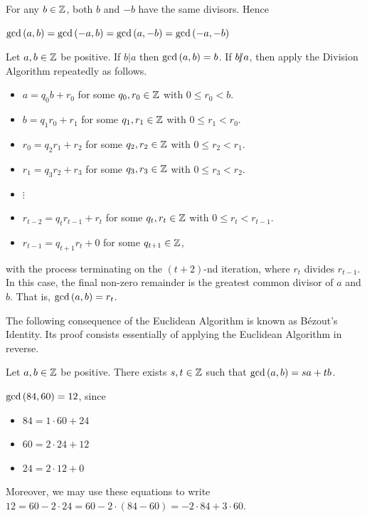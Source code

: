 \documentclass[11pt,fleqn,dvipsnames,usenames]{article}
\newcommand{\p}{\noindent}
\begin{document}
\note For any $b\in\mathbb{Z}$, both $b$ and $-b$ have the same divisors.  Hence
\begin{center}
$\text{gcd}\left(a,b\right) = \text{gcd}\left(-a,b\right) = \text{gcd}\left(a,-b\right) = \text{gcd}\left(-a,-b\right)$
\end{center}
\newpage

\begin{theorem}\label{euclideanalg}
Let $a,b\in\mathbb{Z}$ be positive.  If $b|a$ then $\text{gcd}\left(a,b\right) = b$.  If $b|\kern-0.9ex{/} a$, then apply the Division Algorithm repeatedly as follows.

\begin{itemize}[\ ]
\item $a = q_{0}b + r_{0}$ for some $q_{0},r_{0}\in\mathbb{Z}$ with $0 \leq r_{0} < b$.
\item $b = q_{1}r_{0} + r_{1}$ for some $q_{1},r_{1}\in\mathbb{Z}$ with $0 \leq r_{1} < r_{0}$.
\item $r_{0} = q_{2}r_{1} + r_{2}$ for some $q_{2},r_{2}\in\mathbb{Z}$ with $0 \leq r_{2} < r_{1}$.
\item $r_{1} = q_{3}r_{2} + r_{3}$ for some $q_{3},r_{3}\in\mathbb{Z}$ with $0 \leq r_{3} < r_{2}$.
\item {}$\vdots$
\item $r_{t-2} = q_{t}r_{t-1} + r_{t}$ for some $q_{t},r_{t}\in\mathbb{Z}$ with $0 \leq r_{t} < r_{t-1}$.
\item $r_{t-1} = q_{t+1}r_{t} + 0$ for some $q_{t+1}\in\mathbb{Z}$,
\end{itemize}
with the process terminating on the $(t+2)$-nd iteration, where $r_{t}$ divides $r_{t-1}$.  In this case, the final non-zero remainder is the greatest common divisor of $a$ and $b$.  That is, $\text{gcd}\left(a,b\right) = r_{t}$.
\end{theorem}
\vsp

\p The following consequence of the Euclidean Algorithm is known as B\'{e}zout's Identity.  Its proof consists  essentially of applying the Euclidean Algorithm in reverse.
\vsp

\begin{corollary}\label{bezout}
Let $a,b\in\mathbb{Z}$ be positive.  There exists $s,t\in\mathbb{Z}$ such that $\text{gcd}\left(a,b\right) = sa + tb$.
\end{corollary}
%
\begin{example}
$\text{gcd}\left(84,60\right) = 12$, since
\begin{itemize}[\ ]
\item $84 = 1\cdot 60 + 24$
\item $60 = 2\cdot 24 + 12$
\item $24 = 2\cdot 12 + 0$
\end{itemize}

\p Moreover, we may use these equations to write $12 = 60 - 2\cdot 24 = 60 - 2\cdot (84 - 60) = -2\cdot 84 + 3\cdot 60$.
\end{example}
\end{document}
